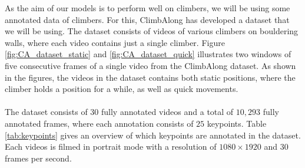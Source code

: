 \documentclass[./main.tex]{subfiles}
\begin{document}
As the aim of our models is to perform well on climbers, we will be using some annotated data of climbers. For this, ClimbAlong has developed a dataset that we will be using. The dataset consists of videos of various climbers on bouldering walls, where each video contains just a single climber. Figure \ref{fig:CA_dataset_static} and \ref{fig:CA_dataset_quick} illustrates two windows of five consecutive frames of a single video from the ClimbAlong dataset. As shown in the figures, the videos in the dataset contains both static positions, where the climber holds a position for a while, as well as quick movements.
\\
\\
The dataset consists of $30$ fully annotated videos and a total of $10,293$ fully annotated frames, where each annotation consists of $25$ keypoints. Table \ref{tab:keypoints} gives an overview of which keypoints are annotated in the dataset. Each videos is filmed in portrait mode with a resolution of $1080 \times 1920$ and $30$ frames per second.
\end{document}
